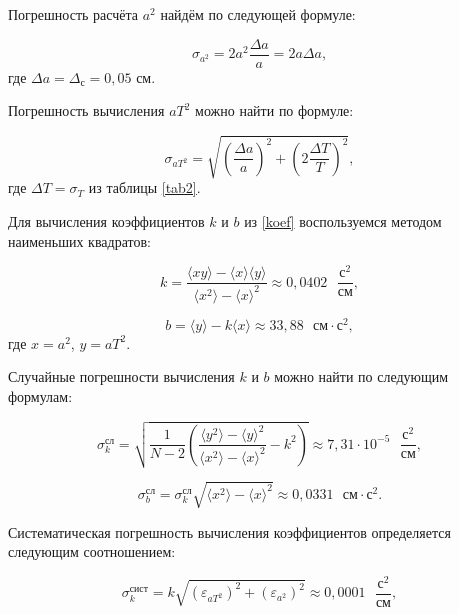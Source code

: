 \documentclass[a4paper,12pt]{article} %
\begin{document}
Погрешность расчёта $ a^2 $ найдём по следующей формуле:

\begin{equation}
\sigma_{a^2}=2a^2\frac{\Delta a}{a}=2a\Delta a,
\end{equation}
где $ \Delta a = \Delta_\text{с} = 0,05$ см.

Погрешность вычисления $ aT^2 $ можно найти по формуле:

\begin{equation}
\sigma_{aT^2} = \sqrt{\left(  \frac{\Delta a}{a} \right)^2 + \left( 2\frac{\Delta T}{T} \right)^2 },
\end{equation}
где $ \Delta T = \sigma_T $ из таблицы \ref{tab2}.

Для вычисления коэффициентов $ k $ и $ b $ из \eqref{koef} воспользуемся методом наименьших квадратов:

\begin{equation}
k=\frac{\langle xy\rangle-\langle x\rangle \langle y\rangle}{\langle x^2\rangle - \langle x\rangle^2}\approx 0,04
02\text{ }\frac{\text{с}^2}{\text{см}},
\end{equation}

\begin{equation}
b=\langle y \rangle -k\langle x \rangle\approx 33,88\text{ }\text{см}\cdot\text{с}^2,
\end{equation}
где $ x=a^2 $, $ y=aT^2 $.

Случайные погрешности вычисления $ k $ и $ b $ можно найти по следующим формулам:

\begin{equation}
\sigma_k^\text{сл}=\sqrt{\frac{1}{N-2}\left(\frac{\langle y^2 \rangle - \langle y \rangle^2}{\langle x^2 \rangle - \langle x \rangle^2} - k^2 \right) } \approx 7,31 \cdot 10^{-5} \text{ }\frac{\text{с}^2}{\text{см}},
\end{equation}

\begin{equation}
\sigma_b^\text{сл}= \sigma_k^\text{сл} \sqrt{\langle x^2 \rangle - \langle x \rangle^2} \approx 0,0331 \text{ }\text{см}\cdot\text{с}^2.
\end{equation}

Систематическая погрешность вычисления коэффициентов определяется следующим соотношением:

\begin{equation}
\sigma^\text{сист}_k = k\sqrt{\left( \varepsilon_{aT^2} \right)^2 + \left( \varepsilon_{a^2} \right)^2 } \approx 0,0001 \text{ }\frac{\text{с}^2}{\text{см}},
\end{equation}
\end{document}
